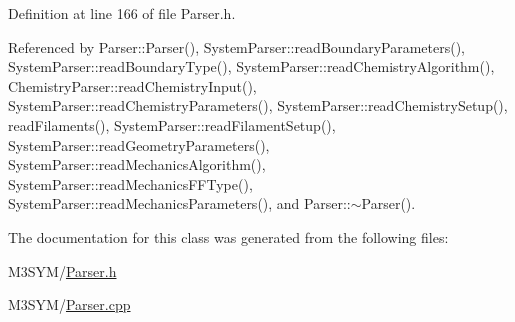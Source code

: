 Definition at line 166 of file Parser.\+h.



Referenced by Parser\+::\+Parser(), System\+Parser\+::read\+Boundary\+Parameters(), System\+Parser\+::read\+Boundary\+Type(), System\+Parser\+::read\+Chemistry\+Algorithm(), Chemistry\+Parser\+::read\+Chemistry\+Input(), System\+Parser\+::read\+Chemistry\+Parameters(), System\+Parser\+::read\+Chemistry\+Setup(), read\+Filaments(), System\+Parser\+::read\+Filament\+Setup(), System\+Parser\+::read\+Geometry\+Parameters(), System\+Parser\+::read\+Mechanics\+Algorithm(), System\+Parser\+::read\+Mechanics\+F\+F\+Type(), System\+Parser\+::read\+Mechanics\+Parameters(), and Parser\+::$\sim$\+Parser().



The documentation for this class was generated from the following files\+:\begin{DoxyCompactItemize}
\item 
M3\+S\+Y\+M/\hyperlink{Parser_8h}{Parser.\+h}\item 
M3\+S\+Y\+M/\hyperlink{Parser_8cpp}{Parser.\+cpp}\end{DoxyCompactItemize}
